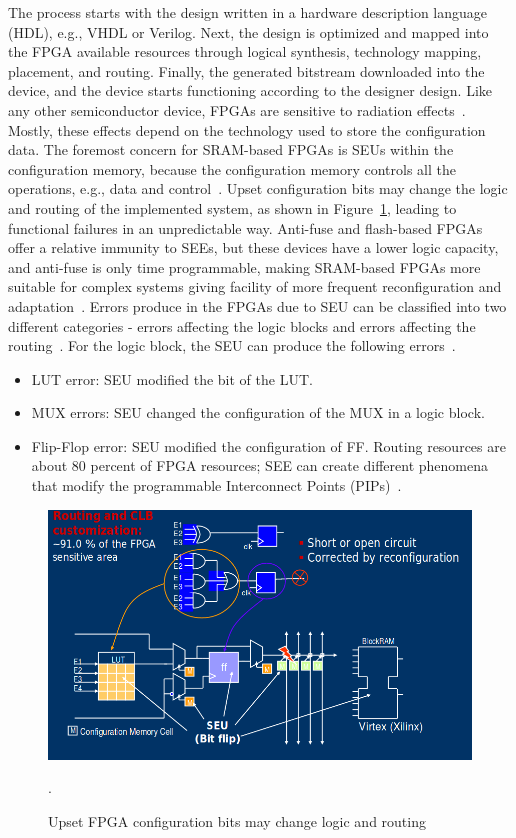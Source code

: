 The process starts with the design written
in a hardware description language (HDL), e.g., VHDL or Verilog. Next, the design is optimized and mapped into the FPGA available resources through logical synthesis,
technology mapping, placement, and routing. Finally, the generated bitstream downloaded into the device, and the device starts functioning according to the designer design.
Like any other semiconductor device, FPGAs are sensitive to radiation effects~\citep{hobeika2014multi}.
Mostly, these effects depend on the technology used to store the configuration data.
The foremost concern for SRAM-based FPGAs is
SEUs within the configuration memory, because the configuration memory controls all the operations, e.g., data and control~\citep{manuzzato2010single}.
Upset configuration bits may change the logic and routing of the implemented system, as
shown in Figure~\ref{fig:seu}, leading to functional failures in an unpredictable way. Anti-fuse and flash-based
FPGAs offer a relative immunity to SEEs, but these devices have a lower logic capacity, and anti-fuse is only time programmable, making SRAM-based FPGAs more
suitable for complex systems giving facility of more frequent reconfiguration and adaptation~\citep{quinn2015validation, violante2004simulation}. 
Errors produce in the FPGAs due to SEU can be classified into two different categories - errors affecting the logic blocks and errors affecting the routing~\citep{sterpone2006new}. For the logic block, the SEU can produce the following errors~\citep{sterpone2006new}.
\begin{itemize}
\item LUT error: SEU modified the bit of the LUT.
\item MUX errors: SEU changed the configuration of the MUX in a logic block.
\item Flip-Flop error: SEU modified the configuration of FF.
Routing resources are about 80 percent of FPGA resources; SEE can create different phenomena that modify the programmable Interconnect Points (PIPs)~\citep{sterpone2006new}.
\end{itemize}
\begin{figure}
 \centering
  \captionsetup{justification=centering}    
   \includegraphics[scale=0.4]{figures/img/seu.png}
   \caption{Upset FPGA configuration bits may change logic and routing~\citep{manuzzato2010single}}.
\label{fig:seu}
\end{figure}

